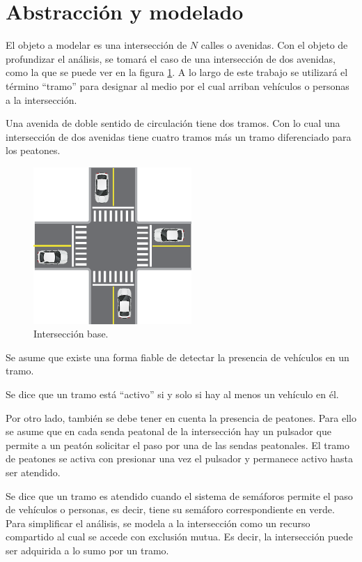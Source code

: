 \lstset {
tabsize=2,
basicstyle=\footnotesize\ttfamily,breaklines=true
}

\section{Abstracción y modelado}
	El objeto a modelar es una intersección de $N$ calles o avenidas. Con el objeto de profundizar el análisis, se tomará el caso de una intersección de dos avenidas, como la que se puede ver en la figura \ref{fig:interseccion-base}. A lo largo de este trabajo se utilizará el término \enquote{tramo} para designar al medio por el cual arriban vehículos o personas a la intersección.
	
	Una avenida de doble sentido de circulación tiene dos tramos. Con lo cual una intersección de dos avenidas tiene cuatro tramos más un tramo diferenciado para los peatones. 
	\begin{figure}[htbp]
	\centering
	\includegraphics[width=6cm]{imagenes/interseccion-base.eps}
	\caption{Intersección base.}
	\label{fig:interseccion-base}
	\end{figure}
	Se asume que existe una forma fiable de detectar la presencia de vehículos en un tramo.

	Se dice que un tramo está \enquote{activo} si y solo si hay al menos un vehículo en él.

	Por otro lado, también se debe tener en cuenta la presencia de peatones. Para ello se asume que en cada senda peatonal de la intersección hay un pulsador que permite a un peatón solicitar el paso por una de las sendas peatonales. El tramo de peatones se activa con presionar una vez el pulsador y permanece activo hasta ser atendido.

	Se dice que un tramo es atendido cuando el sistema de semáforos permite el paso de vehículos o personas, es decir, tiene su semáforo correspondiente en verde. Para simplificar el análisis, se modela a la intersección como un recurso compartido al cual se accede con exclusión mutua. Es decir, la intersección puede ser adquirida a lo sumo por un tramo.



